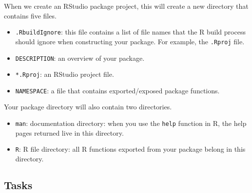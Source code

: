 \documentclass[a4paper,justified,openany]{tufte-handout}\usepackage[]{graphicx}\usepackage[]{color}
\newcommand{\cc}{\texttt}
\begin{document}
When we create an RStudio package project, this will create a new directory that
contains five files.
\begin{itemize}
\item \cc{.RbuildIgnore}: this file contains a list of file names that the R
  build process should ignore when constructing your package. For example, the \cc{.Rproj} file.
\item \cc{DESCRIPTION}: an overview of your package.
\item \cc{*.Rproj}: an RStudio project file.
\item \cc{NAMESPACE}: a file that contains exported/exposed package functions.
\end{itemize}
Your package directory will also contain two directories.
\begin{itemize}
\item \cc{man}: documentation directory: when you use the \cc{help} function in R, the help pages returned live in
this directory.
\item \cc{R}: R file directory: all R functions exported from your package belong in this directory.
\end{itemize}

\subsection*{Tasks}
\end{document}
